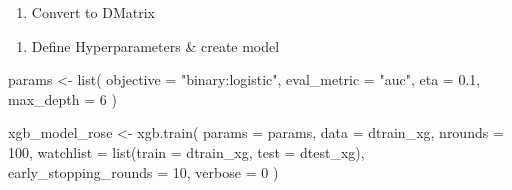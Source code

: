\documentclass[
  11pt,
  letterpaper,
  DIV=11,
  numbers=noendperiod]{scrartcl}
\newenvironment{Shaded}{}{}
\newcommand{\AttributeTok}[1]{\textcolor[rgb]{0.84,0.23,0.29}{#1}}
\newcommand{\DecValTok}[1]{\textcolor[rgb]{0.00,0.36,0.77}{#1}}
\newcommand{\FloatTok}[1]{\textcolor[rgb]{0.00,0.36,0.77}{#1}}
\newcommand{\FunctionTok}[1]{\textcolor[rgb]{0.44,0.26,0.76}{#1}}
\newcommand{\NormalTok}[1]{\textcolor[rgb]{0.14,0.16,0.18}{#1}}
\newcommand{\OtherTok}[1]{\textcolor[rgb]{0.44,0.26,0.76}{#1}}
\newcommand{\SpecialCharTok}[1]{\textcolor[rgb]{0.00,0.36,0.77}{#1}}
\newcommand{\StringTok}[1]{\textcolor[rgb]{0.01,0.18,0.38}{#1}}
\providecommand{\tightlist}{%
  \setlength{\itemsep}{0pt}\setlength{\parskip}{0pt}}\usepackage{longtable,booktabs,array}
\begin{document}
\begin{enumerate}
\def\labelenumi{\arabic{enumi}.}
\setcounter{enumi}{3}
\tightlist
\item
  Convert to DMatrix
\end{enumerate}

\begin{Shaded}
\end{Shaded}

\begin{enumerate}
\def\labelenumi{\arabic{enumi}.}
\setcounter{enumi}{4}
\tightlist
\item
  Define Hyperparameters \& create model
\end{enumerate}

\begin{Shaded}
\begin{Highlighting}[]
\NormalTok{params }\OtherTok{\textless{}{-}} \FunctionTok{list}\NormalTok{(}
  \AttributeTok{objective =} \StringTok{"binary:logistic"}\NormalTok{,}
  \AttributeTok{eval\_metric =} \StringTok{"auc"}\NormalTok{,}
  \AttributeTok{eta =} \FloatTok{0.1}\NormalTok{,}
  \AttributeTok{max\_depth =} \DecValTok{6}
\NormalTok{)}

\NormalTok{xgb\_model\_rose }\OtherTok{\textless{}{-}} \FunctionTok{xgb.train}\NormalTok{(}
  \AttributeTok{params =}\NormalTok{ params,}
  \AttributeTok{data =}\NormalTok{ dtrain\_xg,}
  \AttributeTok{nrounds =} \DecValTok{100}\NormalTok{,}
  \AttributeTok{watchlist =} \FunctionTok{list}\NormalTok{(}\AttributeTok{train =}\NormalTok{ dtrain\_xg, }\AttributeTok{test =}\NormalTok{ dtest\_xg),}
  \AttributeTok{early\_stopping\_rounds =} \DecValTok{10}\NormalTok{,}
  \AttributeTok{verbose =} \DecValTok{0}
\NormalTok{)}
\end{Highlighting}
\end{Shaded}
\end{document}
